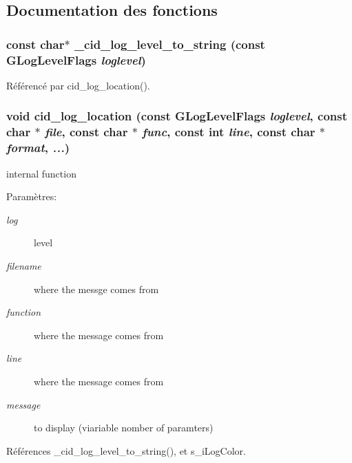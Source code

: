 \subsection{Documentation des fonctions}
\subsubsection{\setlength{\rightskip}{0pt plus 5cm}const char$\ast$ \_\-cid\_\-log\_\-level\_\-to\_\-string (const GLogLevelFlags {\em loglevel})}\label{cid-messages_8c_432b36349bd27c11dbf8c5c704e3692b}




Référencé par cid\_\-log\_\-location().
\subsubsection{\setlength{\rightskip}{0pt plus 5cm}void cid\_\-log\_\-location (const GLogLevelFlags {\em loglevel}, \/  const char $\ast$ {\em file}, \/  const char $\ast$ {\em func}, \/  const int {\em line}, \/  const char $\ast$ {\em format}, \/   {\em ...})}\label{cid-messages_8c_bd4aa69876ed51a037deb593eb7219cb}


internal function \begin{Desc}
\item[Paramètres:]
\begin{description}
\item[{\em log}]level \item[{\em filename}]where the messge comes from \item[{\em function}]where the message comes from \item[{\em line}]where the message comes from \item[{\em message}]to display (viariable nomber of paramters) \end{description}
\end{Desc}


Références \_\-cid\_\-log\_\-level\_\-to\_\-string(), et s\_\-iLogColor.
